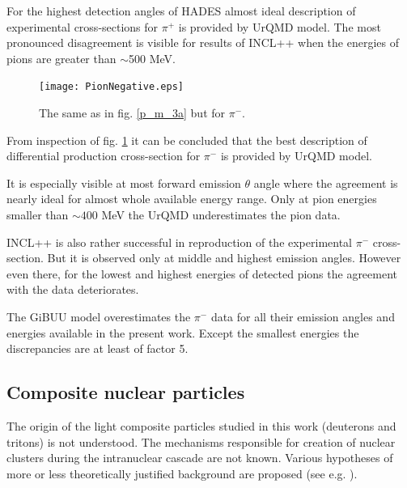 For the highest detection angles of HADES 
almost ideal description of experimental cross-sections for $\pi^{+}$ is provided by UrQMD  model. The most pronounced disagreement is visible for results of INCL++ when the energies of pions are greater than $\sim$500 MeV.

\begin{figure}[!hbt]
	\centering
	\texttt{[image: PionNegative.eps]}%
	\caption{\label{pim_m_3a} The same as in fig. \ref{p_m_3a} but for
		$\pi^{-}$.
	}
\end{figure}


From inspection of fig. \ref{pim_m_3a} it can be concluded that the best description of differential production cross-section for $\pi^{-}$ 
is provided by UrQMD model.

It is especially visible at most forward emission  $\theta$ angle where the agreement is
nearly ideal for almost whole available energy range. Only at pion energies smaller than $\sim400$ MeV the UrQMD underestimates the pion data. 

INCL++ is also rather successful in reproduction of the experimental $\pi^{-}$ cross-section. But it is observed only at middle and highest emission angles. 
However even there, for the lowest and highest energies of detected pions the agreement with 
the data deteriorates. 

The GiBUU model overestimates the $\pi^{-}$ data for all their emission angles and energies available in the present work. Except the smallest energies the discrepancies are at least of factor 5.

\subsection{\label{composite_part} Composite nuclear particles}

The origin of the light composite particles
studied in this work (deuterons and tritons)
is not understood.
The mechanisms responsible for creation of nuclear clusters during the intranuclear cascade are not known.
Various hypotheses of more or less theoretically justified background are proposed
(see e.g. \cite{LET02A,HODGSON20031,Iwamoto_2008,Wei_2014,PyszClus}). 

